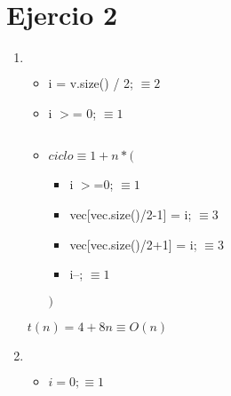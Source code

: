 \documentclass{article}
\begin{document}
\section*{Ejercio 2}

\begin{enumerate}
    \item $ $
        
        \begin{itemize}
            \item i = v.size() / 2; $\equiv 2$
            \item i $>$= 0; $\equiv 1$

            $ $

            \item $ciclo \equiv 1 + n*($
                \begin{itemize}
                    \item i $>$=0; $\equiv 1$
                    \item vec[vec.size()/2-1] = i; $\equiv 3$
                    \item vec[vec.size()/2+1] = i; $\equiv 3$
                    \item i--; $\equiv 1$
                \end{itemize}
                $)$
        \end{itemize}
        $t(n) = 4 + 8n \equiv O(n)$
    \item $ $
        
        \begin{itemize}
            \item $i = 0; \equiv 1$

            $ $


\end{itemize}
\end{enumerate}
\end{document}

